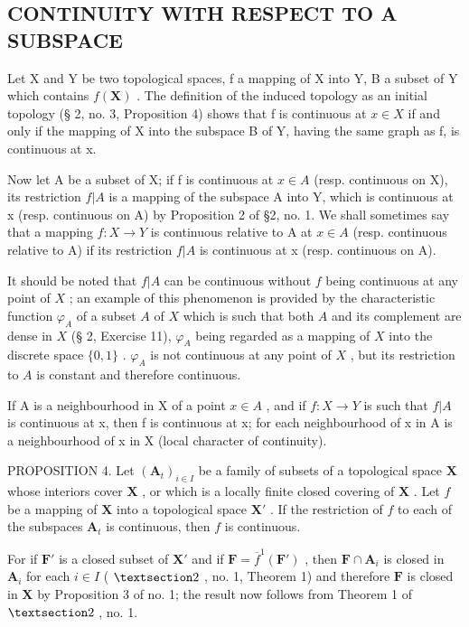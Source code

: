 \subsection{CONTINUITY WITH RESPECT TO A SUBSPACE}

Let X and Y be two topological spaces, f a mapping of X into Y, B a subset of Y which contains \(f(\mathbf{X})\) . The definition of the induced topology as an initial topology (§ 2, no. 3, Proposition 4) shows that f is continuous at \(x \in X\) if and only if the mapping of X into the subspace B of Y, having the same graph as f, is continuous at x.

Now let A be a subset of X; if f is continuous at \(x \in A\) (resp. continuous on X), its restriction \(f|A\) is a mapping of the subspace A into Y, which is continuous at x (resp. continuous on A) by Proposition 2 of §2, no. 1. We shall sometimes say that a mapping \(f: X \to Y\) is continuous relative to A at \(x \in A\) (resp. continuous relative to A) if its restriction \(f|A\) is continuous at x (resp. continuous on A).

It should be noted that \(f|A\) can be continuous without \(f\) being continuous at any point of \(X\) ; an example of this phenomenon is provided by the characteristic function \(\varphi_A\) of a subset \(A\) of \(X\) which is such that both \(A\) and its complement are dense in \(X\) (§ 2, Exercise 11), \(\varphi_A\) being regarded as a mapping of \(X\) into the discrete space \(\{0, 1\}\) . \(\varphi_A\) is not continuous at any point of \(X\) , but its restriction to \(A\) is constant and therefore continuous.

If A is a neighbourhood in X of a point \(x \in A\) , and if \(f: X \to Y\) is such that \(f|A\) is continuous at x, then f is continuous at x; for each neighbourhood of x in A is a neighbourhood of x in X (local character of continuity).

PROPOSITION 4. Let \((\mathbf{A}_t)_{i\in I}\) be a family of subsets of a topological space \(\mathbf{X}\) whose interiors cover \(\mathbf{X}\) , or which is a locally finite closed covering of \(\mathbf{X}\) . Let \(f\) be a mapping of \(\mathbf{X}\) into a topological space \(\mathbf{X}'\) . If the restriction of \(f\) to each of the subspaces \(\mathbf{A}_t\) is continuous, then \(f\) is continuous.

For if \(\mathbf{F}'\) is a closed subset of \(\mathbf{X}'\) and if \(\mathbf{F} = \overline{f}^{1} (\mathbf{F}')\) , then \(\mathbf{F} \cap \mathbf{A}_i\) is closed in \(\mathbf{A}_i\) for each \(i \in I\) ( \(\S 2\) , no. 1, Theorem 1) and therefore \(\mathbf{F}\) is closed in \(\mathbf{X}\) by Proposition 3 of no. 1; the result now follows from Theorem 1 of \(\S 2\) , no. 1.

